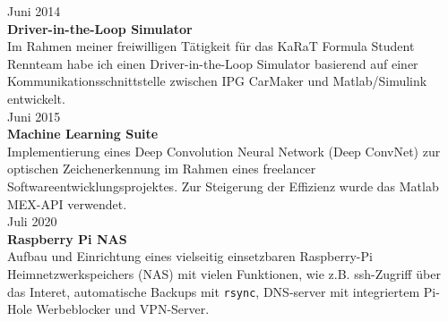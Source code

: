 \documentclass{mycv}
\begin{document}
{\rlap{\color{templateColor1}\rule[0mm]{\textwidth}{\ulinewidth}}}
\begin{paracol}{2}


	{\RaggedLeft Juni 2014\\ \bfseries Driver-in-the-Loop Simulator\\}
	Im Rahmen meiner freiwilligen T{\"a}tigkeit f{\"u}r das KaRaT Formula Student
	Rennteam habe ich einen Driver-in-the-Loop Simulator basierend auf einer
	Kommunikationsschnittstelle zwischen IPG CarMaker und Matlab/Simulink
	entwickelt.\\

	{\RaggedLeft Juni 2015\\ \bfseries Machine Learning Suite\\}
	Implementierung eines Deep Convolution Neural Network (Deep ConvNet) zur
	optischen Zeichenerkennung im Rahmen eines freelancer
	Softwareentwicklungsprojektes. Zur Steigerung der Effizienz wurde das
	Matlab MEX-API verwendet.\\

	{\RaggedLeft Juli 2020\\ \bfseries Raspberry Pi NAS\\}
	Aufbau und Einrichtung eines vielseitig einsetzbaren Raspberry-Pi
	Heimnetzwerkspeichers (NAS) mit vielen Funktionen, wie z.B.
	ssh-Zugriff {\"u}ber das Interet, automatische Backups mit \verb|rsync|,
	DNS-server mit integriertem Pi-Hole Werbeblocker und	VPN-Server.

\switchcolumn
{}%


\end{paracol}
\end{document}

